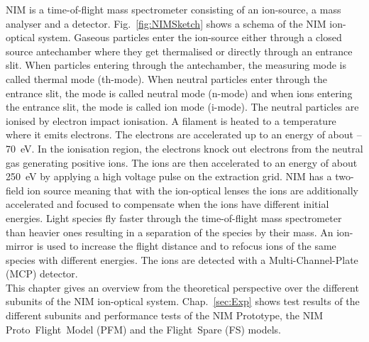	NIM is a time-of-flight mass spectrometer consisting of an ion-source, a mass analyser and a detector. Fig.~\ref{fig:NIMSketch} shows a schema of the NIM ion-optical system. Gaseous particles enter the ion-source either through a closed source antechamber where they get thermalised or directly through an entrance slit. When particles entering through the antechamber, the measuring mode is called thermal mode (th-mode). When neutral particles enter through the entrance slit, the mode is called neutral mode (n-mode) and when ions entering the entrance slit, the mode is called ion mode (i-mode). The neutral particles are ionised by electron impact ionisation. A filament is heated to a temperature where it emits electrons. The electrons are accelerated up to an energy of about --70~eV. In the ionisation region, the electrons knock out electrons from the neutral gas generating positive ions. The ions are then accelerated to an energy of about 250~eV by applying a high voltage pulse on the extraction grid. NIM has a two-field ion source meaning that with the ion-optical lenses the ions are additionally accelerated and focused to compensate when the ions have different initial energies. Light species fly faster through the time-of-flight mass spectrometer than heavier ones resulting in a separation of the species by their mass. An ion-mirror is used to increase the flight distance and to refocus ions of the same species with different energies. The ions are detected with a Multi-Channel-Plate (MCP) detector.\\
	This chapter gives an overview from the theoretical perspective over the different subunits of the NIM ion-optical system.	Chap.~\ref{sec:Exp} shows test results of the different subunits and performance tests of the NIM Prototype, the NIM Proto~Flight~Model (PFM) and the Flight~Spare (FS) models.
	
